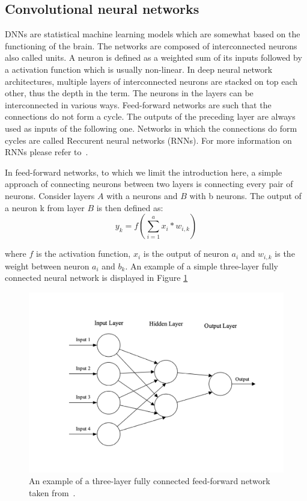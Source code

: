 \subsection{Convolutional neural networks}\label{subsec:convolutional-neural-networks}
DNNs are statistical machine learning models which are somewhat based on the functioning of the brain.
The networks are composed of interconnected neurons also called units.
A neuron is defined as a weighted sum of its inputs followed by a activation function which is usually non-linear.
In deep neural network architectures, multiple layers of interconnected neurons are stacked on top each other, thus the depth in the term.
The neurons in the layers can be interconnected in various ways.
Feed-forward networks are such that the connections do not form a cycle.
The outputs of the preceding layer are always used as inputs of the following one. 
Networks in which the connections do form cycles are called Reccurent neural networks (RNNs). 
For more information on RNNs please refer to~\cite{reccurent-neural-networks}.

In feed-forward networks, to which we limit the introduction here, a simple approach of connecting neurons between two layers is connecting every pair of neurons. 
Consider layers $A$ with a neurons and $B$ with b neurons.
The output of a neuron k from layer $B$ is then defined as:
\begin{equation}
    y_k=f(\sum_{i=1}^{a}x_i*w_{i,k})
\end{equation}

where $f$ is the activation function, $x_i$ is the output of neuron $a_i$ and $w_{i, k}$ is the weight between neuron $a_i$ and $b_k$. An example of a simple three-layer fully connected neural network is displayed in Figure \ref{fig:simple-net}
\begin{figure}[!htpb]
\centering
   \includegraphics[width=0.8\linewidth]{img/ch2/simple-net}
   \caption[Feed-forward network example]{An example of a three-layer fully connected feed-forward network taken from~\cite{conv-intro}.}
    \label{fig:simple-net}
\end{figure}

